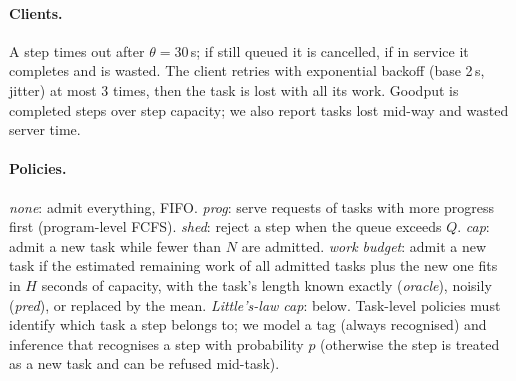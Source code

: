 \documentclass[10pt,twocolumn,letterpaper]{article}
\begin{document}
\paragraph{Clients.} A step times out after $\theta{=}30$\,s; if still queued it is cancelled, if in service it completes and is wasted. The client retries with exponential backoff (base 2\,s, jitter) at most 3 times, then the task is lost with all its work. Goodput is completed steps over step capacity; we also report tasks lost mid-way and wasted server time.
\paragraph{Policies.} \emph{none}: admit everything, FIFO. \emph{prog}: serve requests of tasks with more progress first (program-level FCFS). \emph{shed}: reject a step when the queue exceeds $Q$. \emph{cap}: admit a new task while fewer than $N$ are admitted. \emph{work budget}: admit a new task if the estimated remaining work of all admitted tasks plus the new one fits in $H$ seconds of capacity, with the task's length known exactly (\emph{oracle}), noisily (\emph{pred}), or replaced by the mean. \emph{Little's-law cap}: below. Task-level policies must identify which task a step belongs to; we model a tag (always recognised) and inference that recognises a step with probability $p$ (otherwise the step is treated as a new task and can be refused mid-task).
\end{document}
